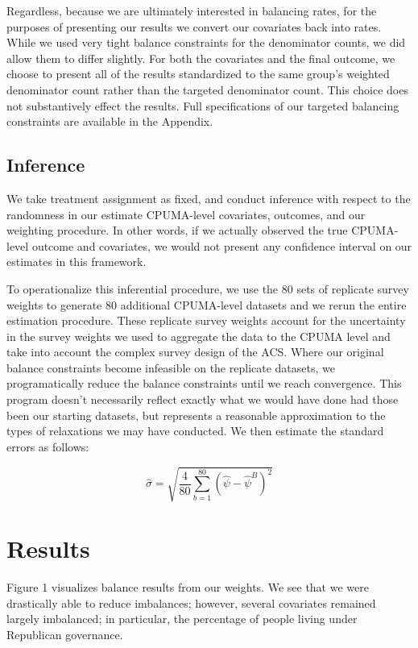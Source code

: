 \documentclass[12pt]{article}
\begin{document}
Regardless, because we are ultimately interested in balancing rates, for the purposes of presenting our results we convert our covariates back into rates. While we used very tight balance constraints for the denominator counts, we did allow them to differ slightly. For both the covariates and the final outcome, we choose to present all of the results standardized to the same group's weighted denominator count rather than the targeted denominator count. This choice does not substantively effect the results. Full specifications of our targeted balancing constraints are available in the Appendix.

\subsection{Inference}

We take treatment assignment as fixed, and conduct inference with respect to the randomness in our estimate CPUMA-level covariates, outcomes, and our weighting procedure. In other words, if we actually observed the true CPUMA-level outcome and covariates, we would not present any confidence interval on our estimates in this framework.

To operationalize this inferential procedure, we use the 80 sets of replicate survey weights to generate 80 additional CPUMA-level datasets and we rerun the entire estimation procedure. These replicate survey weights account for the uncertainty in the survey weights we used to aggregate the data to the CPUMA level and take into account the complex survey design of the ACS. Where our original balance constraints become infeasible on the replicate datasets, we programatically reduce the balance constraints until we reach convergence. This program doesn't necessarily reflect exactly what we would have done had those been our starting datasets, but represents a reasonable approximation to the types of relaxations we may have conducted. We then estimate the standard errors as follows:

$$
\hat{\sigma} = \sqrt{\frac{4}{80}\sum_{b = 1}^{80}(\hat{\psi} - \hat{\psi}^B)^2}
$$

\section{Results}

Figure 1 visualizes balance results from our weights. We see that we were drastically able to reduce imbalances; however, several covariates remained largely imbalanced; in particular, the percentage of people living under Republican governance. 
\end{document}
